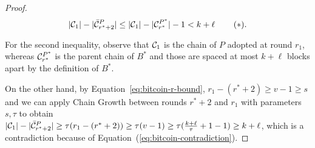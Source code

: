 \begin{proof}

  \[
     |\mathcal{C}_1| - |\bar {\mathcal{C}}^P_{r^* + 2}| \leq
     |\mathcal{C}_1| - |\mathcal{C}^{P^*}_{r^*}| - 1 <
     k + \ell\, \label{eq:bitcoin-contradiction}\tag{$\ast$}.
  \]

  For the second inequality, observe that
  $\mathcal{C}_1$ is the chain of $P$ adopted at round $r_1$,
  whereas $\mathcal{C}^{P^*}_{r^*}$ is
  the parent chain of $B^*$ and those are spaced at most $k + \ell$ blocks
  apart by the definition of $B^*$.

  On the other hand, by Equation~\ref{eq:bitcoin-r-bound}, $r_1 - (r^* + 2) \geq v - 1 \geq s$ and
  we can apply Chain Growth between rounds $r^* + 2$ and $r_1$
  with parameters $s, \tau$ to obtain
  $|\mathcal{C}_1| - |\bar {\mathcal{C}}^P_{r^* + 2}| \geq \tau(r_1 - (r^* + 2)) \geq \tau (v - 1) \geq
  \tau (\frac{k + \ell}{\tau} + 1 - 1) \geq k + \ell$,
  which is a contradiction because of Equation~(\ref{eq:bitcoin-contradiction}).

  \Qed
\end{proof}


